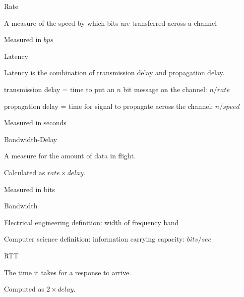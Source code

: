 \documentclass[main.tex]{subfiles}
\begin{document}
\small


\begin{card}{Rate}
\item A measure of the speed by which bits are transferred across a channel
\item Measured in $bps$
\end{card}


\begin{card}{Latency}
\item Latency is the combination of transmission delay and propagation delay.
\item transmission delay = time to put an $n$ bit message on the channel: $n/rate$
\item propagation delay = time for signal to propagate across the channel: $n/speed$
\item Measured in seconds
\end{card}

\begin{card}{Bandwidth-Delay}
\item A measure for the amount of data in flight.
\item Calculated as $rate \times delay$.
\item Measured in bits
\end{card}

\begin{card}{Bandwidth}
\item Electrical engineering definition: width of frequency band
\item Computer science definition: information carrying capacity: $bits/sec$
\end{card}

\begin{card}{RTT}
\item The time it takes for a response to arrive.
\item Computed as $2\times delay$.
\end{card}
\full{}
\end{document}

